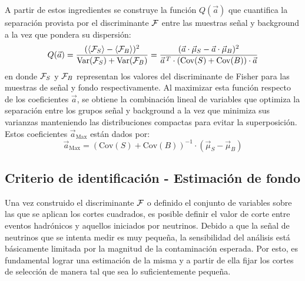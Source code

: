	A partir de estos ingredientes se construye la función $Q(\vec{a})$ que cuantifica la separación provista por el discriminante $\cal{F}$
	entre las muestras señal y background a la vez que pondera su dispersión:
	\begin{equation}
	Q(\vec{a}) = \frac{( \langle{\cal F}_S\rangle - \langle{\cal F}_B \rangle)^2}{\text{Var}({\cal F}_S)+\text{Var}({\cal F}_B)}
	= \frac{(\vec{a}\cdot\vec{\mu}_S  - \vec{a}\cdot\vec{\mu}_B)^2}
					{\vec{a}^{\,T} \cdot (\text{Cov}(S) + \text{Cov}(B) )\cdot\vec{a}} 
	\end{equation}
	en donde ${\cal F}_S$ y ${\cal F}_B$ representan los valores del discriminante de Fisher para las muestras de señal y fondo respectivamente.
	Al maximizar esta función respecto de los coeficientes $\vec{a}$, se obtiene la combinación lineal de variables que optimiza la separación entre los grupos señal y background a la vez que minimiza sus varianzas manteniendo las distribuciones compactas para evitar la superposición. 
	Estos coeficientes $\vec{a}_{\text{Max}}$ están dados por:
	\begin{equation}
	\vec{a}_{\text{Max}} = (\text{Cov}(S) + \text{Cov}(B) )^{-1} \cdot (\vec{\mu}_S - \vec{\mu}_B)   
	\end{equation}
	
	
	\subsection{Criterio de identificación - Estimación de fondo}
	\label{sbsc:fondo}
	
	Una vez construido el discriminante ${\cal F}$ o definido el conjunto de variables sobre las que se aplican los cortes cuadrados, es posible definir el valor de corte entre eventos hadrónicos y aquellos iniciados por neutrinos.
	Debido a que la señal de neutrinos que se intenta medir es muy pequeña, la sensibilidad del análisis está básicamente limitada por la magnitud de la contaminación esperada.
	Por esto, es fundamental lograr una estimación de la misma y a partir de ella fijar los cortes de selección de manera tal que sea lo suficientemente pequeña.
	
